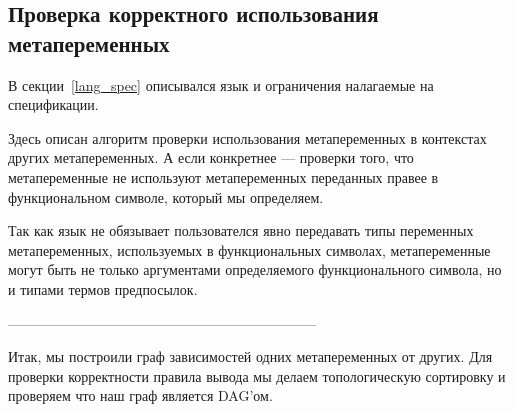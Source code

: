 \subsection{Проверка корректного использования метапеременных}\label{toposort}
В секции~\ref{lang_spec} описывался язык и ограничения налагаемые на спецификации.

Здесь описан алгоритм проверки использования метапеременных в контекстах других метапеременных. А если конкретнее --- проверки того, что метапеременные не используют метапеременных переданных правее в функциональном символе, который мы определяем.

Так как язык не обязывает пользователся явно передавать типы переменных метапеременных, используемых в функциональных символах, метапеременные могут быть не только аргументами определяемого функционального символа, но и типами термов предпосылок.

------------------------------------------------------------------

Итак, мы построили граф зависимостей одних метапеременных от других. Для проверки корректности правила вывода мы делаем топологическую сортировку и проверяем что наш граф является DAG'ом.
